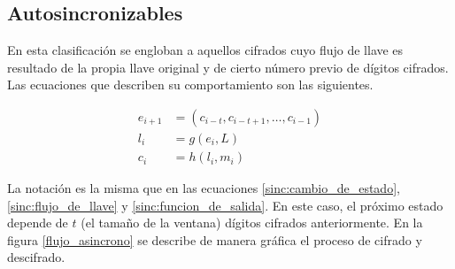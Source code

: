 %
%

\subsection{Autosincronizables}

En esta clasificación se engloban a aquellos cifrados cuyo flujo de llave es
resultado de la propia llave original y de cierto número previo de dígitos
cifrados. Las ecuaciones que describen su comportamiento son las siguientes.

\begin{align}
  \label{asinc:cambio_de_estado}
  e_{i+1} &= (c_{i - t}, c_{i - t + 1}, \dots, c_{i - 1}) \\
  \label{asinc:flujo_de_llave}
  l_i &= g(e_i, L) \\
  \label{asinc:funcion_de_salida}
  c_i &= h(l_i, m_i)
\end{align}

La notación es la misma que en las ecuaciones \ref{sinc:cambio_de_estado},
\ref{sinc:flujo_de_llave} y \ref{sinc:funcion_de_salida}. En este caso, el
próximo estado depende de $ t $ (el tamaño de la ventana) dígitos cifrados
anteriormente. En la figura \ref{flujo_asincrono} se describe de manera
gráfica el proceso de cifrado y descifrado.

